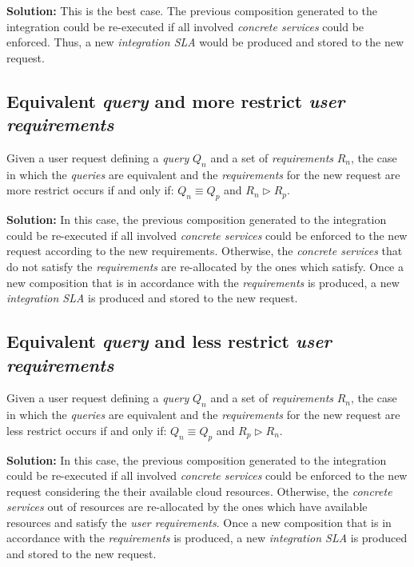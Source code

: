 \bigskip
\noindent \textbf{Solution:} This is the best case. The previous composition generated to the integration could be re-executed if all involved \textsl{concrete services} could be enforced. Thus, a new \textsl{integration SLA} would be produced and stored to the new request.

\subsection{Equivalent \textsl{query} and more restrict \textsl{user requirements}}
Given a user request defining a \textsl{query} $Q_{n}$ and a set of \textsl{requirements} $R_{n}$, the case in which the \textsl{queries} are equivalent and the \textsl{requirements} for the new request are more restrict occurs if and only if: $Q_{n} \equiv Q_{p}$ and $R_{n} \triangleright R_{p}$.

\bigskip
\noindent \textbf{Solution:} In this case,  the previous composition generated to the integration could be re-executed if all involved \textsl{concrete services} could be enforced to the new request according to the new requirements. Otherwise, the \textsl{concrete services} that do not satisfy the \textsl{requirements} are re-allocated by the ones which satisfy. Once a new composition that is in accordance with the \textsl{requirements} is produced, a new \textsl{integration SLA} is produced and stored to the new request.

\subsection{Equivalent \textsl{query} and less restrict \textsl{user requirements}}
Given a user request defining a \textsl{query} $Q_{n}$ and a set of \textsl{requirements} $R_{n}$, the case in which the \textsl{queries} are equivalent and the \textsl{requirements} for the new request are less restrict occurs if and only if: $Q_{n} \equiv Q_{p}$ and $R_{p} \triangleright R_{n}$.

\bigskip
\noindent \textbf{Solution:} In this case,  the previous composition generated to the integration could be re-executed if all involved \textsl{concrete services} could be enforced to the new request considering the their available cloud resources. Otherwise, the \textsl{concrete services} out of resources are re-allocated by the ones which have available resources and satisfy the \textsl{user requirements}. Once a new composition that is in accordance with the \textsl{requirements} is produced, a new \textsl{integration SLA} is produced and stored to the new request.

